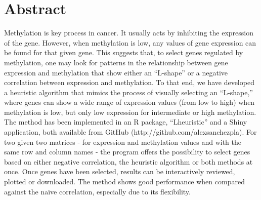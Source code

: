 \documentclass[10pt,letterpaper]{article}
\newcommand{\getIndex}[2]{
  \ForEach{,}{\IfEq{#1}{\thislevelitem}{\number\thislevelcount\ExitForEach}{}}{#2}
}
\newcommand{\getAff}[1]{
  \getIndex{#1}{Universitat de Barcelona (UB),Vall d'Hebron Research
Institute (VHIR)}
}
\begin{document}
\vspace*{0.2in}

\section*{Abstract}
Methylation is key process in cancer. It usually acts by inhibiting the
expression of the gene. However, when methylation is low, any values of
gene expression can be found for that given gene. This suggests that, to
select genes regulated by methylation, one may look for patterns in the
relationship between gene expression and methylation that show either an
``L-shape'' or a negative correlation between expression and
methylation. To that end, we have developed a heuristic algorithm that
mimics the process of visually selecting an ``L-shape,'' where genes can
show a wide range of expression values (from low to high) when
methylation is low, but only low expression for intermediate or high
methylation. The method has been implemented in an R package,
``Lheuristic'' and a Shiny application, both available from GitHub
(http://github.com/alexsanchezpla). For two given two matrices - for
expression and methylation values and with the same row and column names
- the program offers the possibility to select genes based on either
negative correlation, the heuristic algorithm or both methods at once.
Once genes have been selected, results can be interactively reviewed,
plotted or downloaded. The method shows good performance when compared
against the naïve correlation, especially due to its flexibility.
\end{document}
